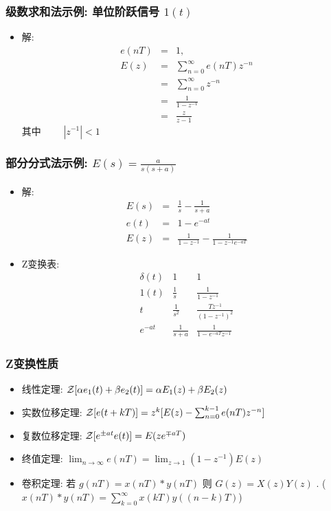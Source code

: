 \documentclass[table]{article}
\begin{document}
\begin{frame}
\frametitle{级数求和法示例: 单位阶跃信号 $1(t)$}
\label{sec-3-1-4}

\begin{itemize}
\item <2-> 解: 
       \begin{eqnarray*}
       e(nT)&=&1 , \\
       E(z) &=  &\sum_{n=0}^{\infty}e(nT)z^{-n} \\
       	&=& \sum_{n=0}^{\infty}z^{-n} \\
       &=& \frac{1}{1-z^{-1}} \\
       &=& \frac{z}{z-1}
       \end{eqnarray*}
       其中  $\qquad |z^{-1}|<1$
\end{itemize}
\end{frame}
\begin{frame}
\frametitle{部分分式法示例:  $E(s)=\frac{a}{s(s+a)}$}
\label{sec-3-1-5}

\begin{itemize}
\item <2->解:
      \begin{eqnarray*}
      E(s) & = & \frac{1}{s}-\frac{1}{s+a}\\
      e(t) &=& 1-e^{-at} \\
      E(z) &=& \frac{1}{1-z^{-1}} -\frac{1}{1-z^{-1}e^{-aT}}
      \end{eqnarray*}
\item <3->Z变换表:
      \[\begin{matrix}
      \delta(t) & 1 & 1 \\
      1(t) & \frac{1}{s} & \frac{1}{1-z^{-1}} \\
      t & \frac{1}{s^2} & \frac{Tz^{-1}}{(1-z^{-1})^2} \\
      e^{-at} & \frac{1}{s+a} &\frac{1}{1-e^{-aT}z^{-1}}
      \end{matrix}\]
\end{itemize}
\end{frame}
\begin{frame}
\frametitle{Z变换性质}
\label{sec-3-1-6}

\begin{itemize}
\item <2->线性定理:    ${\cal Z}[\alpha e_1(t)+\beta e_2(t)]=\alpha E_1(z)+\beta E_2(z)$
\item <3->实数位移定理:  ${\cal Z}[e(t+kT)] = z^k[E(z)-\sum_{n=0}^{k-1}e(nT)z^{-n}]$
\item <4->复数位移定理:  ${\cal Z}[e^{\pm at}e(t)] = E(ze^{\mp aT})$
\item <5->终值定理:  $\lim_{n\rightarrow\infty}e(nT)=\lim_{z\rightarrow 1}(1-z^{-1})E(z)$
\item <6->卷积定理: 若  $g(nT)=x(nT)*y(nT)$  则  $G(z)=X(z)Y(z)$  . ($x(nT)*y(nT)=\sum_{k=0}^{\infty}x(kT)y((n-k)T)$)
\end{itemize}
\end{frame}
\end{document}
